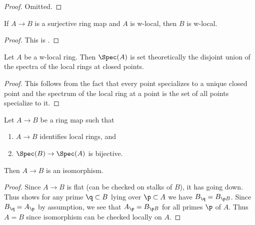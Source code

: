 \begin{proof}
  Omitted.
\end{proof}

\begin{lemma}
  \label{thm:surjective-w-local-ring}
  If \(A \to B\) is a surjective ring map and \(A\) is w-local, then \(B\) is w-local.
  \leanok
\end{lemma}

\begin{proof}
  \leanok
  This is .
\end{proof}

\begin{lemma}
  \label{thm:w-local-set-decomposition}
  Let $A$ be a w-local ring. Then $\Spec (A)$ is set theoretically the disjoint union of the spectra of the local
  rings at closed points.
\end{lemma}

\begin{proof}
  This follows from the fact that every point specializes to a unique closed point and the spectrum of the local ring at a point is the set of all points specialize to it.
\end{proof}

\begin{lemma}
  \label{thm:isom-of-identifies-local-rings-bijective}
  \leanok
  Let $A \to B$ be a ring map such that
  \begin{enumerate}
    \item $A \to B$ identifies local rings, and
    \item $\Spec (B) \to \Spec (A)$ is bijective.
  \end{enumerate}
  Then $A \to B$ is an isomorphism.
\end{lemma}

\begin{proof}
    \leanok
    Since $A \to B$ is flat (can be checked on stalks of \(B\)), it has going down. %
    Thus  shows for any prime $\q \subset B$ lying over $\p \subset A$ we have $B_{\q} = B_{\p B}$. Since $B_{\q} = A_{\p}$ by assumption, we see that $A_{\p} = B_{\p B}$ for all primes $\p$ of $A$. Thus $A = B$ since isomorphism can be checked locally on $A$.
\end{proof}

